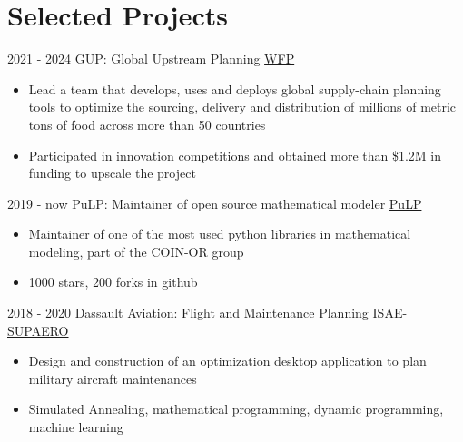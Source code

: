 \documentclass[letterpaper]{twentysecondcv} %
\begin{document}
\section{Selected Projects}
\begin{twenty}
  \twentyitem
      {2021 - 2024}
    {}
        {GUP: Global Upstream Planning}
        {\href{https://www.wfp.org/}{WFP}}
        {}
        {
        {\begin{itemize}
        \item Lead a team that develops, uses and deploys global supply-chain planning tools to optimize the sourcing, delivery and distribution of millions of metric tons of food across more than 50 countries
        \item Participated in innovation competitions and obtained more than \$1.2M in funding to upscale the project
        \vspace{2mm}
        \end{itemize}}
        }
  \twentyitem
      {2019 - now}
    {}
        {PuLP: Maintainer of open source mathematical modeler}
        {\href{https://github.com/coin-or/pulp}{PuLP}}
        {}
        {
        {\begin{itemize}
        \item Maintainer of one of the most used python libraries in mathematical modeling, part of the COIN-OR group
        \item 1000 stars, 200 forks in github
        \vspace{2mm}
        \end{itemize}}
        }
  \twentyitem
      {2018 - 2020}
    {}
        {Dassault Aviation: Flight and Maintenance Planning}
        {\href{https://www.isae-supaero.fr/en/}{ISAE-SUPAERO}}
        {}
        {
        {\begin{itemize}
        \item Design and construction of an optimization desktop application to plan military aircraft maintenances
        \item Simulated Annealing, mathematical programming, dynamic programming, machine learning
        \vspace{2mm}
        \end{itemize}}
        }

\end{twenty}
\end{document}
